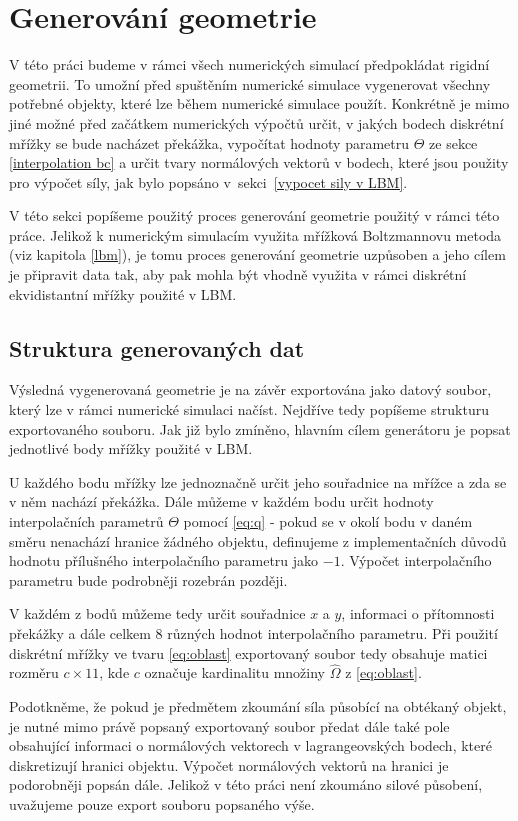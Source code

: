 \chapter{Generování geometrie}\label{geometrie}
V této práci budeme v rámci všech numerických simulací předpokládat rigidní geometrii. To umožní před spuštěním numerické simulace vygenerovat všechny potřebné objekty, které lze během numerické simulace použít. Konkrétně je mimo jiné možné před začátkem numerických výpočtů určit, v jakých bodech diskrétní mřížky se bude nacházet překážka, vypočítat hodnoty parametru $ \Theta $ ze sekce \ref{interpolation bc} a určit tvary normálových vektorů v bodech, které jsou použity pro výpočet síly, jak bylo popsáno v~sekci~\ref{vypocet sily v LBM}.

V této sekci popíšeme použitý proces generování geometrie použitý v rámci této práce. Jelikož k numerickým simulacím využita mřížková Boltzmannovu metoda (viz kapitola \ref{lbm}), je tomu proces generování geometrie uzpůsoben a jeho cílem je připravit data tak, aby pak mohla být vhodně využita v rámci diskrétní ekvidistantní mřížky použité v LBM. 

\section{Struktura generovaných dat}\label{struktura dat}
Výsledná vygenerovaná geometrie je na závěr exportována jako datový soubor, který lze v rámci numerické simulaci načíst. Nejdříve tedy popíšeme strukturu exportovaného souboru. Jak již bylo zmíněno, hlavním cílem generátoru je popsat jednotlivé body mřížky použité v LBM.

U každého bodu mřížky lze jednoznačně určit jeho souřadnice na mřížce a zda se v něm nachází překážka. Dále můžeme v každém bodu určit hodnoty interpolačních parametrů $ \Theta $ pomocí \eqref{eq:q} - pokud se v okolí bodu v daném směru nenachází hranice žádného objektu, definujeme z implementačních důvodů hodnotu přílušného interpolačního parametru jako $ -1$. Výpočet interpolačního parametru bude podrobněji rozebrán později.

V každém z bodů můžeme tedy určit souřadnice $ x $ a $ y $, informaci o přítomnosti překážky a dále celkem 8 různých hodnot interpolačního parametru. Při použití diskrétní mřížky ve tvaru \eqref{eq:oblast} exportovaný soubor tedy obsahuje matici rozměru $ c \times 11$, kde $ c $  označuje kardinalitu množiny $ \hat{\Omega} $ z \eqref{eq:oblast}.

Podotkněme, že pokud je předmětem zkoumání síla působící na obtékaný objekt, je nutné mimo právě popsaný exportovaný soubor předat dále také pole obsahující informaci o normálových vektorech v lagrangeovských bodech, které diskretizují hranici objektu. Výpočet normálových vektorů na hranici je podorobněji popsán dále. Jelikož v této práci není zkoumáno silové působení, uvažujeme pouze export souboru popsaného výše.

